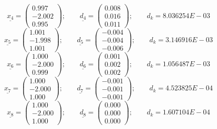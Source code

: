 \documentclass{report}[10pts]
\begin{document}
\[
      \underline{x_{4}}=
      \begin{pmatrix}
      0.997 \\ -2.002 \\ 0.995
      \end{pmatrix}
   ;\qquad
      \underline{d_{4}}=
      \begin{pmatrix}
      0.008 \\ 0.016 \\ 0.011
      \end{pmatrix}
   ;\qquad
   d_k=8.036254E-03
\]
\[
      \underline{x_{5}}=
      \begin{pmatrix}
      1.001 \\ -1.998 \\ 1.001
      \end{pmatrix}
   ;\qquad
      \underline{d_{5}}=
      \begin{pmatrix}
      -0.004 \\ -0.004 \\ -0.006
      \end{pmatrix}
   ;\qquad
   d_k=3.146916E-03
\]
\[
      \underline{x_{6}}=
      \begin{pmatrix}
      1.000 \\ -2.000 \\ 0.999
      \end{pmatrix}
   ;\qquad
      \underline{d_{6}}=
      \begin{pmatrix}
      0.001 \\ 0.002 \\ 0.002
      \end{pmatrix}
   ;\qquad
   d_k=1.056487E-03
\]
\[
      \underline{x_{7}}=
      \begin{pmatrix}
      1.000 \\ -2.000 \\ 1.000
      \end{pmatrix}
   ;\qquad
      \underline{d_{7}}=
      \begin{pmatrix}
      -0.001 \\ -0.001 \\ -0.001
      \end{pmatrix}
   ;\qquad
   d_k=4.523825E-04
\]
\[
      \underline{x_{8}}=
      \begin{pmatrix}
      1.000 \\ -2.000 \\ 1.000
      \end{pmatrix}
   ;\qquad
      \underline{d_{8}}=
      \begin{pmatrix}
      0.000 \\ 0.000 \\ 0.000
      \end{pmatrix}
   ;\qquad
   d_k=1.607104E-04
\]
\end{document}
